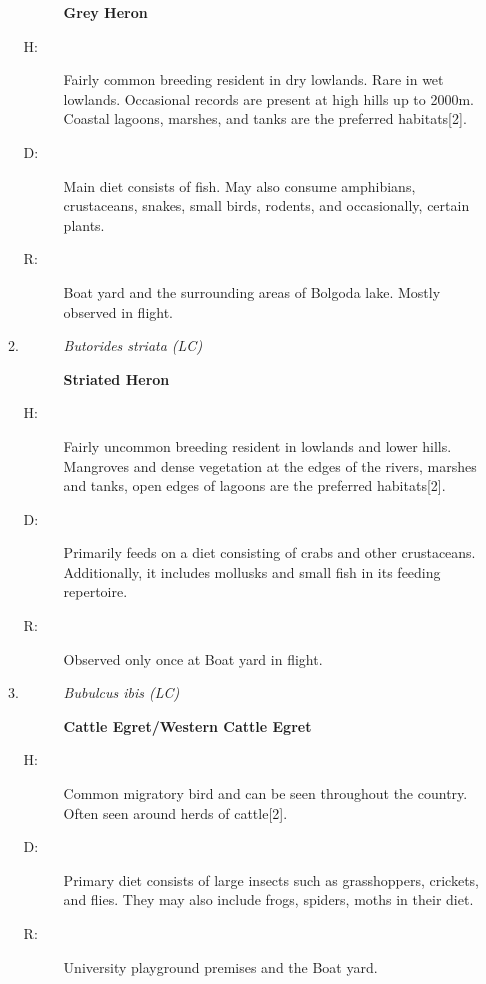\begin{itemize}
\begin{enumerate}
\begin{description}
\textbf{Grey Heron}%
\end{description}%
\begin{description}%
\item[H: ]%
Fairly common breeding resident in dry lowlands. Rare in wet lowlands. Occasional records are present at high hills up to 2000m. Coastal lagoons, marshes, and tanks are the preferred habitats{[}2{]}.%
\item[D: ]%
Main diet consists of fish. May also consume amphibians, crustaceans, snakes, small birds, rodents, and occasionally, certain plants.%
\item[R: ]%
Boat yard and the surrounding areas of Bolgoda lake. Mostly observed in flight.%
\end{description}%
\item%
\begin{description}%
\item[]%
\textit{Butorides striata (LC)}%
\item[]%
\textbf{Striated Heron}%
\end{description}%
\begin{description}%
\item[H: ]%
Fairly uncommon breeding resident in lowlands and lower hills. Mangroves and dense vegetation at the edges of the rivers, marshes and tanks, open edges of lagoons are the preferred habitats{[}2{]}.%
\item[D: ]%
Primarily feeds on a diet consisting of crabs and other crustaceans. Additionally, it includes mollusks and small fish in its feeding repertoire.%
\item[R: ]%
Observed only once at Boat yard in flight.%
\end{description}%
\item%
\begin{description}%
\item[]%
\textit{Bubulcus ibis (LC)}%
\item[]%
\textbf{Cattle Egret/Western Cattle Egret}%
\end{description}%
\begin{description}%
\item[H: ]%
Common migratory bird and can be seen throughout the country. Often seen around herds of cattle{[}2{]}.%
\item[D: ]%
Primary diet consists of large insects such as grasshoppers, crickets, and flies. They may also include frogs, spiders, moths in their diet.%
\item[R: ]%
University playground premises and the Boat yard.%

\end{description}
\end{enumerate}
\end{itemize}
